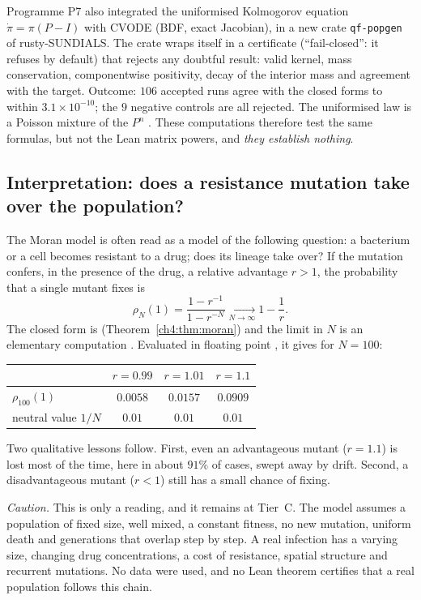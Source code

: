 \begin{numbox}
\tierX{} Programme P7 also integrated the uniformised Kolmogorov equation $\dot\pi=\pi(P-I)$ with CVODE (BDF, exact
Jacobian), in a new crate \texttt{qf-popgen} of rusty-SUNDIALS. The crate wraps itself in a certificate (``fail-closed'': it refuses by default) that rejects
any doubtful result: valid kernel, mass conservation, componentwise positivity,
decay of the interior mass and agreement with the target. Outcome: $106$ accepted runs agree with
the closed forms to within $3.1\times10^{-10}$; the $9$ negative controls are all rejected. The uniformised
law is a Poisson mixture of the $P^n$ \tierC. These computations therefore test the same formulas, but not the
Lean matrix powers, and \emph{they establish nothing}.
\end{numbox}

\subsection{Interpretation: does a resistance mutation take over the population?}

\begin{physbox}
\tierC{} The Moran model is often read as a model of the following question: a bacterium or a cell becomes
resistant to a drug; does its lineage take over? If the mutation confers, in the presence of the
drug, a relative advantage $r>1$, the probability that a single mutant fixes is
\[
\rho_N(1)=\frac{1-r^{-1}}{1-r^{-N}}\xrightarrow[N\to\infty]{}1-\frac1r .
\]
The closed form is \tierA{} (Theorem~\ref{ch4:thm:moran}) and the limit in $N$ is an elementary computation \tierC.
Evaluated in floating point \tierX, it gives for $N=100$:
\begin{center}\small
\begin{tabular}{lccc}
\toprule
& $r=0.99$ & $r=1.01$ & $r=1.1$\\
\midrule
$\rho_{100}(1)$ & $0.0058$ & $0.0157$ & $0.0909$\\
neutral value $1/N$ & $0.01$ & $0.01$ & $0.01$\\
\bottomrule
\end{tabular}
\end{center}
Two qualitative lessons follow. First, even an advantageous mutant ($r=1.1$) is lost most of the time, here
in about $91\%$ of cases, swept away by drift. Second, a disadvantageous mutant ($r<1$) still has a small
chance of fixing.

\emph{Caution.} This is only a reading, and it remains at Tier~C. The model assumes a population of fixed size,
well mixed, a constant fitness, no new mutation, uniform death and generations that overlap step by step.
A real infection has a varying size, changing drug concentrations, a cost of resistance, spatial structure
and recurrent mutations. No data were used, and no Lean theorem certifies that a real population follows
this chain.
\end{physbox}

